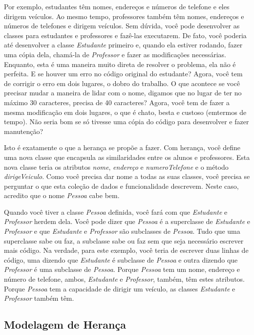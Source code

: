 \documentclass[
	article,			%
	12pt,				%
	openright,
	twoside,			%
	a4paper,			%
	english,			%
	french,
	brazil,				%
	sumario=tradicional
	]{abntex2}
\begin{document}
Por exemplo, estudantes têm nomes, endereços e números de telefone e eles dirigem veículos. Ao mesmo tempo, professores também têm nomes, endereços e números de telefones e dirigem veículos. Sem dúvida, você pode desenvolver as classes para estudantes e professores e fazê-las executarem. De fato, você poderia até desenvolver a classe \emph{Estudante} primeiro e, quando ela estiver rodando, fazer uma cópia dela, chamá-la de \emph{Professor} e fazer as modificações necessárias. Enquanto, esta é uma maneira muito direta de resolver o problema, ela não é perfeita. E se houver um erro no código original do estudante? Agora, você tem de corrigir o erro em dois lugares, o dobro do trabalho. O que acontece se você precisar mudar a maneira de lidar com o nome, digamos que no lugar de ter no máximo 30 caracteres, precisa de 40 caracteres? Agora, você tem de fazer a mesma modificação em dois lugares, o que é chato, besta e custoso (emtermos de tempo). Não seria bom se só tivesse uma cópia do código para desenvolver e fazer manutenção?

Isto é exatamente o que a herança se propõe a fazer. Com herança, você define uma nova classe que encapsula as similaridades entre os alunos e professores. Esta nova classe teria os atributos \emph{nome}, \emph{endereço} e \emph{numeroTelefone} e o método \emph{dirigeVeiculo}. Como você precisa dar nome a todas as suas classes, você precisa se perguntar o que esta coleção de dados e funcionalidade descrevem. Neste caso, acredito que o nome \emph{Pessoa} cabe bem.

Quando você tiver a classe \emph{Pessoa} definida, você fará com que \emph{Estudante} e \emph{Professor} herdem dela. Você pode dizer que \emph{Pessoa} é a superclasse de \emph{Estudante} e \emph{Professor} e que \emph{Estudante} e \emph{Professor} são subclasses de \emph{Pessoa}. Tudo que uma superclasse sabe ou faz, a subclasse sabe ou faz sem que seja necessário escrever mais código. Na verdade, para este exemplo, você teria de escrever duas linhas de código, uma dizendo que \emph{Estudante} é subclasse de \emph{Pessoa} e outra dizendo que \emph{Professor} é uma subclasse de \emph{Pessoa}. Porque \emph{Pessoa} tem um nome, endereço e número de telefone, ambos, \emph{Estudante} e \emph{Professor}, também, têm estes atributos. Porque \emph{Pessoa} tem a capacidade de dirigir um veículo, as classes \emph{Estudante} e \emph{Professor} também têm.

\subsection{Modelagem de Herança}
\end{document}
